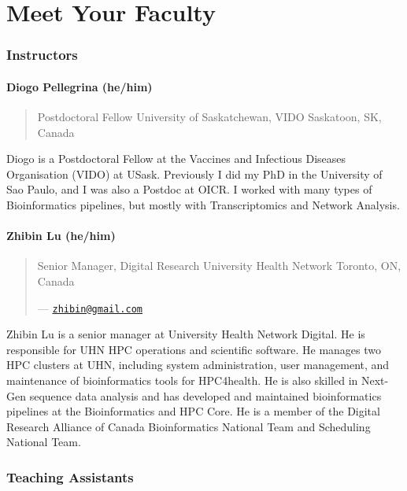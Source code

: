 \documentclass[
]{book}
\begin{document}
\chapter{Meet Your Faculty}\label{meet-your-faculty}

\subsection{Instructors}\label{instructors}

\subsubsection{Diogo Pellegrina (he/him)}\label{diogo-pellegrina-hehim}

\begin{quote}
Postdoctoral Fellow
University of Saskatchewan, VIDO
Saskatoon, SK, Canada
\end{quote}

Diogo is a Postdoctoral Fellow at the Vaccines and Infectious Diseases Organisation (VIDO) at USask. Previously I did my PhD in the University of Sao Paulo, and I was also a Postdoc at OICR. I worked with many types of Bioinformatics pipelines, but mostly with Transcriptomics and Network Analysis.

\subsubsection{Zhibin Lu (he/him)}\label{zhibin-lu-hehim}

\begin{quote}
Senior Manager, Digital Research
University Health Network
Toronto, ON, Canada

--- \href{mailto:zhibin@gmail.com}{\nolinkurl{zhibin@gmail.com}}
\end{quote}

Zhibin Lu is a senior manager at University Health Network Digital. He is responsible for UHN HPC operations and scientific software. He manages two HPC clusters at UHN, including system administration, user management, and maintenance of bioinformatics tools for HPC4health. He is also skilled in Next-Gen sequence data analysis and has developed and maintained bioinformatics pipelines at the Bioinformatics and HPC Core. He is a member of the Digital Research Alliance of Canada Bioinformatics National Team and Scheduling National Team.

\subsection{Teaching Assistants}\label{teaching-assistants}
\end{document}
